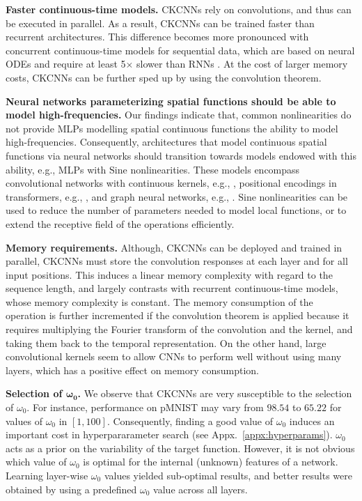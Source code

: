 \documentclass{article}
\begin{document}
\textbf{Faster continuous-time models.} CKCNNs rely on convolutions, and thus can be executed in parallel. As a result, CKCNNs can be trained faster than recurrent architectures. This difference becomes more pronounced with concurrent continuous-time models for sequential data, which are based on neural ODEs and require at least 5$\times$ slower than RNNs \citep{kidger2020neural}. At the cost of larger memory costs, CKCNNs can be further sped up by using the convolution theorem. 

\textbf{Neural networks parameterizing spatial functions should be able to model high-frequencies.} 
Our findings indicate that, common nonlinearities do not provide MLPs modelling spatial continuous functions the ability to model high-frequencies. Consequently, architectures that model continuous spatial functions via neural networks should transition towards models endowed with this ability, e.g., MLPs with $\mathrm{Sine}$ nonlinearities. These models encompass convolutional networks with continuous kernels, e.g., \cite{schutt2017schnet, thomas2018tensor, wu2019pointconv}, positional encodings in transformers, e.g., \cite{romero2020group, hutchinson2020lietransformer}, and graph neural networks, e.g., \cite{defferrard2020deepsphere}. $\mathrm{Sine}$ nonlinearities can be used to reduce the number of parameters needed to model local functions, or to extend the receptive field of the operations efficiently.


\textbf{Memory requirements.}  Although, CKCNNs can be deployed and trained in parallel, CKCNNs must store the convolution responses at each layer and for all input positions. This induces a linear memory complexity with regard to the sequence length, and largely contrasts with recurrent continuous-time models, whose memory complexity is constant. The memory consumption of the operation is further incremented if the convolution theorem is applied because it requires multiplying the Fourier transform of the convolution and the kernel, and taking them back to the temporal representation.
On the other hand, large convolutional kernels seem to allow CNNs to perform well without using many layers, which has a positive effect on memory consumption.

\textbf{Selection of $\boldsymbol{\omega_0}$.} We observe that CKCNNs are very susceptible to the selection of $\omega_0$. For instance, performance on pMNIST may vary from $98.54$ to $65.22$ for values of $\omega_0$ in $[1, 100]$. Consequently, finding a good value of $\omega_0$ induces an important cost in hyperpararameter search (see Appx.~\ref{appx:hyperparams}). 
$\omega_0$ acts as a prior on the variability of the target function. However, it is not obvious which value of $\omega_0$ is optimal for the internal (unknown) features of a network. Learning layer-wise $\omega_0$ values yielded sub-optimal results, and better results were obtained by using a predefined $\omega_0$ value across all layers.
\end{document}
